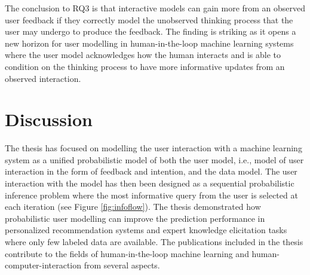 \documentclass[dissertation,math,vertlayout,pdfa,colorlinks]{aaltoseries}
\begin{document}
The conclusion to RQ3 is that interactive models can gain more from an observed user feedback if they correctly model the unobserved thinking process that the user may undergo to produce the feedback. The finding is striking as it opens a new horizon for user modelling in human-in-the-loop machine learning systems where the user model acknowledges how the human interacts and is able to condition on the thinking process to have more informative updates from an observed interaction.

\chapter{Discussion}

The thesis has focused on modelling the user interaction with a machine learning system as a unified probabilistic model of both the user model, i.e., model of user interaction in the form of feedback and intention, and the data model. The user interaction with the model has then been designed as a sequential probabilistic inference problem where the most informative query from the user is selected at each iteration (see Figure \ref{fig:infoflow}). The thesis demonstrated how probabilistic user modelling can improve the prediction performance in personalized recommendation systems and expert knowledge elicitation tasks where only few labeled data are available. The publications included in the thesis contribute to the fields of human-in-the-loop machine learning and human-computer-interaction from several aspects.


\end{document}
